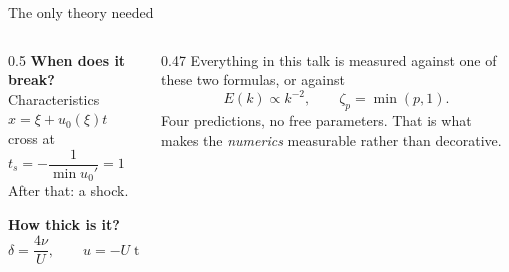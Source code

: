 \documentclass[aspectratio=169,10pt]{beamer}
\begin{document}
\begin{frame}{The only theory needed}
  \begin{columns}[T]
    \begin{column}{0.5\textwidth}
      \textbf{When does it break?}\\[1mm]
      Characteristics $x=\xi+u_0(\xi)t$ cross at
      \[ t_s = -\frac{1}{\min u_0'} = 1 \quad (u_0=\sin x). \]
      After that: a shock.

      \vspace{4mm}
      \textbf{How thick is it?}
      \[ \delta = \frac{4\nu}{U}, \qquad
         u = -U\tanh\!\frac{U(x-x_0)}{2\nu}. \]
    \end{column}
    \begin{column}{0.47\textwidth}
      \small
      Everything in this talk is measured against one of these two formulas,
      or against
      \[ E(k)\propto k^{-2}, \qquad \zeta_p=\min(p,1). \]
      \vspace{1mm}
      \color{faint}
      Four predictions, no free parameters. That is what makes the \emph{numerics}
      measurable rather than decorative.
    \end{column}
  \end{columns}
\end{frame}
\end{document}
